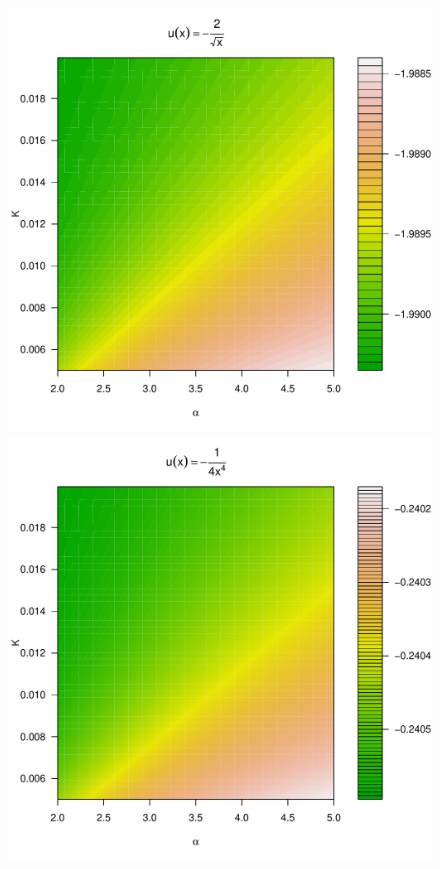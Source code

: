 \documentclass[11pt,a4]{amsart}
\newcommand{\1}{{\mathbf 1}}
\begin{document}
\begin{figure}[htb!]
  \begin{minipage}{0.25\linewidth}
    \includegraphics[width=\textwidth]{preference_pareto5e-1_A.pdf}
  \end{minipage}\hfill
  \begin{minipage}{0.25\linewidth}
    \includegraphics[width=\textwidth]{preference_pareto4_A.pdf}

\end{minipage}
\end{figure}
\end{document}

